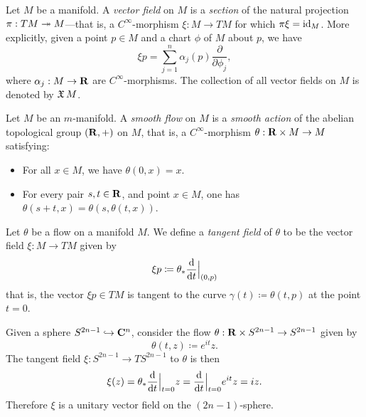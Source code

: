 \begin{definition}
    \label{def:vector-field}
    Let \(M\) be a manifold. A \emph{vector field} on \(M\) is a \emph{section} of
    the natural projection \(\pi: T M \twoheadrightarrow M\)---that is, a \(C^{\infty}\)-morphism
    \(\xi: M \to T M\) for which \(\pi \xi = \operatorname{id}_M\). More explicitly, given a point
    \(p \in M\) and a chart \(\phi\) of \(M\) about \(p\), we have
    \[
        \xi p = \sum_{j=1}^n \alpha_j(p) \frac{\partial}{\partial \phi_j},
    \]
    where \(\alpha_j: M \to \mathbf{R}\) are \(C^{\infty}\)-morphisms. The collection of all
    vector fields on \(M\) is denoted by \(\operatorname{\mathfrak{X}} M\).
\end{definition}

\begin{definition}[Flow]
    \label{def:flow}
    Let \(M\) be an \(m\)-manifold. A \emph{smooth flow} on \(M\) is a \emph{smooth
        action} of the abelian topological group \((\mathbf{R}, +)\) on \(M\), that is, a
    \(C^{\infty}\)-morphism \(\theta: \mathbf{R} \times M \to M\) satisfying:
    \begin{itemize}\setlength\itemsep{0em}
        \item For all \(x \in M\), we have \(\theta(0, x) = x\).
        \item For every pair \(s, t \in \mathbf{R}\), and point \(x \in M\), one has
              \(\theta(s + t, x) = \theta(s, \theta(t, x))\).
    \end{itemize}
\end{definition}

\begin{definition}
    \label{def:tangent-field-to-a-flow}
    Let \(\theta\) be a flow on a manifold \(M\). We define a \emph{tangent field}
    of \(\theta\) to be the vector field \(\xi: M \to T M\) given by
    \[
        \xi p \coloneq \theta_{*} \frac{\mathrm{d}}{\mathrm{d} t} \Big|_{(0, p)}
    \]
    that is, the vector \(\xi p \in T M\) is tangent to the curve \(\gamma(t)
    \coloneq \theta(t, p)\) at the point \(t = 0\).
\end{definition}

\begin{example}
    \label{exp:unit-vec-field-on-(2n-1)-sphere}
    Given a sphere \(S^{2 n - 1} \hookrightarrow \mathbf{C}^n\), consider the flow \(\theta: \mathbf{R} \times
    S^{2n-1} \to S^{2n-1}\) given by
    \[
        \theta(t, z) \coloneq e^{i t} z.
    \]
    The tangent field \(\xi: S^{2n - 1} \to T S^{2n - 1}\) to \(\theta\) is then
    \[
        \xi(z) = \theta_{*} \frac{\mathrm{d}}{\mathrm{d} t}\Big|_{t=0} z
        = \frac{\mathrm{d}}{\mathrm{d} t}\Big|_{t=0} e^{i t} z
        = i z.
    \]
    Therefore \(\xi\) is a unitary vector field on the \((2n-1)\)-sphere.
\end{example}

